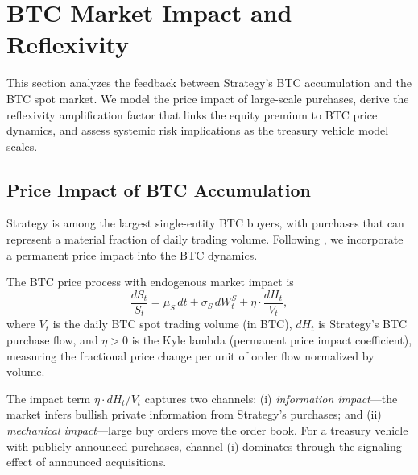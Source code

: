 
\section{BTC Market Impact and Reflexivity}\label{sec:market_impact}

This section analyzes the feedback between Strategy's BTC accumulation and
the BTC spot market.  We model the price impact of large-scale purchases,
derive the reflexivity amplification factor that links the equity premium
to BTC price dynamics, and assess systemic risk implications as the
treasury vehicle model scales.

\subsection{Price Impact of BTC Accumulation}\label{subsec:price_impact}

Strategy is among the largest single-entity BTC buyers, with purchases
that can represent a material fraction of daily trading volume.  Following
\citet{kyle1985continuous}, we incorporate a permanent price impact into
the BTC dynamics.

\begin{definition}\label{def:impact_model}
The BTC price process with endogenous market impact is
\begin{equation}\label{eq:btc_impact}
  \frac{dS_t}{S_t}
  = \mu_S\, dt + \sigma_S\, dW_t^S
    + \eta \cdot \frac{dH_t}{V_t},
\end{equation}
where $V_t$ is the daily BTC spot trading volume (in BTC), $dH_t$ is
Strategy's BTC purchase flow, and $\eta > 0$ is the Kyle lambda
(permanent price impact coefficient), measuring the fractional price
change per unit of order flow normalized by volume.
\end{definition}

\begin{remark}
The impact term $\eta \cdot dH_t / V_t$ captures two channels:
(i) \emph{information impact}---the market infers bullish private
information from Strategy's purchases; and (ii) \emph{mechanical
impact}---large buy orders move the order book.  For a treasury
vehicle with publicly announced purchases, channel (i) dominates
through the signaling effect of announced acquisitions.
\end{remark}

